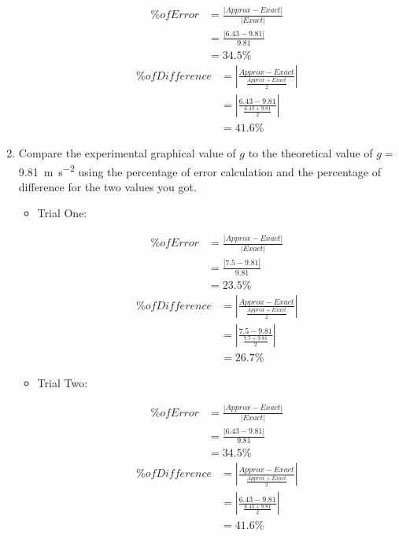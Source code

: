 \documentclass[12pt]{article}
\begin{document}
\begin{enumerate}
\begin{itemize}
        \begin{multicols}{2}
            \begin{align*}
                \% of Error &= \frac{|Approx - Exact|}{|Exact|}\\
                &=\frac{|6.43-9.81|}{9.81}\\
                &=34.5\%
            \end{align*}\break
            \begin{align*}
                \% of Difference &= |\frac{Approx - Exact}{\frac{Approx+Exact}{2}}|\\
                &=|\frac{6.43-9.81}{\frac{6.43+9.81}{2}}|\\
                &=41.6\%
            \end{align*}
        \end{multicols}
    \end{itemize}
    \item Compare the experimental graphical value of $g$ to the theoretical value of $g=$\SI{9.81}{\metre\per\second\squared} using the percentage of error calculation and the percentage of difference for the two values you got.
    \begin{itemize}
        \item Trial One:
        \begin{multicols}{2}
            \begin{align*}
                \% of Error &= \frac{|Approx - Exact|}{|Exact|}\\
                &=\frac{|7.5-9.81|}{9.81}\\
                &=23.5\%
            \end{align*}\break
            \begin{align*}
                \% of Difference &= |\frac{Approx - Exact}{\frac{Approx+Exact}{2}}|\\
                &=|\frac{7.5-9.81}{\frac{7.5+9.81}{2}}|\\
                &=26.7\%
            \end{align*}
        \end{multicols}
        \item Trial Two:
        \begin{multicols}{2}
            \begin{align*}
                \% of Error &= \frac{|Approx - Exact|}{|Exact|}\\
                &=\frac{|6.43-9.81|}{9.81}\\
                &=34.5\%
            \end{align*}\break
            \begin{align*}
                \% of Difference &= |\frac{Approx - Exact}{\frac{Approx+Exact}{2}}|\\
                &=|\frac{6.43-9.81}{\frac{6.43+9.81}{2}}|\\
                &=41.6\%
            \end{align*}
        \end{multicols}
    \end{itemize}
\end{enumerate}
\end{document}
